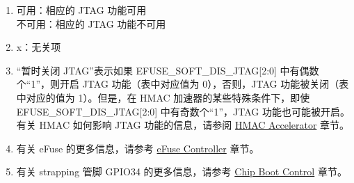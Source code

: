 \begin{tiplisting}
\vspace{-2em}
\begin{enumerate}
\item \label{JTAG footnote: 1}
    可用：相应的 JTAG 功能可用\\
    不可用：相应的 JTAG 功能不可用
\item \label{JTAG footnote: 2}
    x：无关项
\item \label{JTAG footnote: 3}
    “暂时关闭 JTAG”表示如果 EFUSE\_SOFT\_DIS\_JTAG[2:0] 中有偶数个“1”，则开启 JTAG 功能（表中对应值为 0），否则，JTAG 功能被关闭（表中对应的值为 1）。但是，在\chipname{} HMAC 加速器的某些特殊条件下，即使 EFUSE\_SOFT\_DIS\_JTAG[2:0] 中有奇数个“1”，JTAG 功能也可能被开启。
    有关 HMAC 如何影响 JTAG 功能的信息，请参阅 \hyperref[mod:hmac]{HMAC Accelerator} 章节。
\item \label{JTAG footnote: 4}
    有关 eFuse 的更多信息，请参考 \hyperref[mod:efuse]{eFuse Controller} 章节。
\item \label{JTAG footnote: 5}
    有关 strapping 管脚 GPIO34 的更多信息，请参考 \hyperref[mod:bootctrl]{Chip Boot Control} 章节。
\end{enumerate}
\end{tiplisting}
